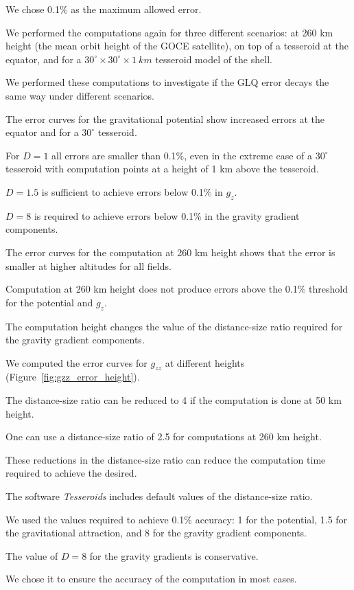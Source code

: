 \documentclass[paper,twocolumn]{geophysics}
\begin{document}
We chose 0.1\% as the maximum allowed error.

We performed the computations again for three different scenarios: at 260 km
height (the mean orbit height of the GOCE satellite), on top of a tesseroid at
the equator, and for a $30^\circ \times 30^\circ \times 1\ km$ tesseroid model
of the shell.

We performed these computations to investigate if the GLQ error decays the same
way under different scenarios.

The error curves for the gravitational potential show increased errors at the
equator and for a $30^\circ$ tesseroid.

For $D=1$ all errors are smaller than 0.1\%,
even in the extreme case of a $30^\circ$ tesseroid with computation points at a
height of 1 km above the tesseroid.

$D=1.5$ is sufficient to achieve errors below 0.1\% in $g_z$.

$D=8$ is required to achieve errors below 0.1\% in
the gravity gradient components.

The error curves for the computation at 260 km height shows that
the error is smaller at higher altitudes for all fields.

Computation at 260 km height does not produce errors above the 0.1\% threshold
for the potential and $g_z$.

The computation height changes the value of the distance-size ratio required
for the gravity gradient components.

We computed the error curves for $g_{zz}$ at different heights
(Figure~\ref{fig:gzz_error_height}).

The distance-size ratio can be reduced to 4 if the computation is done at 50 km
height.

One can use a distance-size ratio of 2.5 for computations at 260 km height.

These reductions in the distance-size ratio can reduce the computation time
required to achieve the desired.



The software \textit{Tesseroids} includes default values of the distance-size
ratio.

We used the values required to achieve 0.1\% accuracy: 1 for the potential,
1.5 for the gravitational attraction, and 8 for the gravity gradient
components.

The value of $D=8$ for the gravity gradients is conservative.

We chose it to ensure the accuracy of the computation in most cases.
\end{document}
